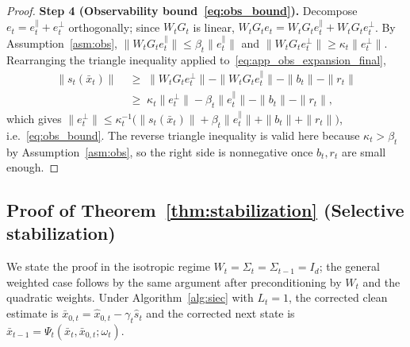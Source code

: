 \documentclass{article}
\theoremstyle{plain}
\theoremstyle{definition}
\theoremstyle{remark}
\begin{document}
\begin{proof}
\textbf{Step 4 (Observability bound~\eqref{eq:obs_bound}).}
Decompose \(e_t = e_t^\parallel + e_t^\perp\) orthogonally; since
\(W_t G_t\) is linear,
\(W_t G_t e_t = W_t G_t e_t^\parallel + W_t G_t e_t^\perp\). By
Assumption~\ref{asm:obs}, \(\|W_t G_t e_t^\parallel\| \le \beta_t
\|e_t^\parallel\|\) and \(\|W_t G_t e_t^\perp\| \ge \kappa_t
\|e_t^\perp\|\). Rearranging the triangle inequality
applied to~\eqref{eq:app_obs_expansion_final},
\begin{align*}
\|s_t(\bar x_t)\|
&\;\ge\; \|W_t G_t e_t^\perp\| - \|W_t G_t e_t^\parallel\| - \|b_t\| - \|r_t\| \\
&\;\ge\; \kappa_t \|e_t^\perp\| - \beta_t \|e_t^\parallel\| - \|b_t\| - \|r_t\|,
\end{align*}
which gives
\(\|e_t^\perp\| \le \kappa_t^{-1}\bigl(\|s_t(\bar x_t)\| + \beta_t
\|e_t^\parallel\| + \|b_t\| + \|r_t\|\bigr)\), i.e.~\eqref{eq:obs_bound}.
The reverse triangle inequality is valid here because
\(\kappa_t > \beta_t\) by Assumption~\ref{asm:obs}, so the right side is
nonnegative once \(b_t, r_t\) are small enough.
\end{proof}

\subsection{Proof of Theorem~\ref{thm:stabilization}
            (Selective stabilization)}
\label{app:thm_stab}

We state the proof in the isotropic regime \(W_t=\Sigma_t=\Sigma_{t-1}=I_d\);
the general weighted case follows by the same argument after preconditioning
by \(W_t\) and the quadratic weights. Under Algorithm~\ref{alg:siec} with
\(L_t=1\), the corrected clean estimate is
\(\bar x_{0,t} = \hat x_{0,t} - \gamma_t \hat s_t\) and the corrected next
state is \(\bar x_{t-1} = \Psi_t(\bar x_t, \bar x_{0,t};\omega_t)\).
\end{document}
